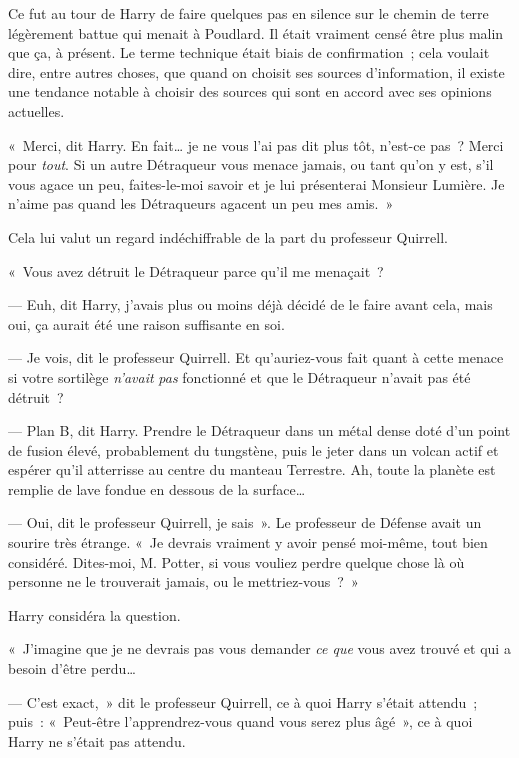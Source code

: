 Ce fut au tour de Harry de faire quelques pas en silence sur le chemin de terre légèrement battue qui menait à Poudlard.
Il était vraiment censé être plus malin que ça, à présent.
Le terme technique était biais de confirmation~; cela voulait dire, entre autres choses, que quand on choisit ses sources d'information, il existe une tendance notable à choisir des sources qui sont en accord avec ses opinions actuelles.

«~Merci, dit Harry.
En fait… je ne vous l'ai pas dit plus tôt, n'est-ce pas~?
Merci pour \emph{tout}.
Si un autre Détraqueur vous menace jamais, ou tant qu'on y est, s'il vous agace un peu, faites-le-moi savoir et je lui présenterai Monsieur Lumière.
Je n'aime pas quand les Détraqueurs agacent un peu mes amis.~»

Cela lui valut un regard indéchiffrable de la part du professeur Quirrell.

«~Vous avez détruit le Détraqueur parce qu'il me menaçait~?

--- Euh, dit Harry, j'avais plus ou moins déjà décidé de le faire avant cela, mais oui, ça aurait été une raison suffisante en soi.

--- Je vois, dit le professeur Quirrell.
Et qu'auriez-vous fait quant à cette menace si votre sortilège \emph{n'avait} \emph{pas} fonctionné et que le Détraqueur n'avait pas été détruit~?

--- Plan B, dit Harry.
Prendre le Détraqueur dans un métal dense doté d'un point de fusion élevé, probablement du tungstène, puis le jeter dans un volcan actif et espérer qu'il atterrisse au centre du manteau Terrestre.
Ah, toute la planète est remplie de lave fondue en dessous de la surface…

--- Oui, dit le professeur Quirrell, je sais~».
Le professeur de Défense avait un sourire très étrange.
«~Je devrais vraiment y avoir pensé moi-même, tout bien considéré.
Dites-moi, M. Potter, si vous vouliez perdre quelque chose là où personne ne le trouverait jamais, ou le mettriez-vous~?~»

Harry considéra la question.

«~J'imagine que je ne devrais pas vous demander \emph{ce que} vous avez trouvé et qui a besoin d'être perdu…

--- C'est exact,~» dit le professeur Quirrell, ce à quoi Harry s'était attendu~; puis~: «~Peut-être l'apprendrez-vous quand vous serez plus âgé~», ce à quoi Harry ne s'était pas attendu.

